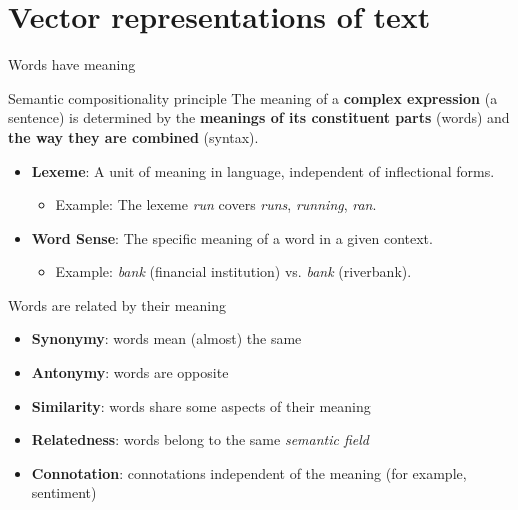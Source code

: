 \documentclass{beamer}
\begin{document}
\section{Vector representations of text}



\begin{frame}{Words have meaning}
  \begin{block}{Semantic compositionality principle}
    The meaning of a \textbf{complex expression} (a sentence) is determined by the \textbf{meanings of its constituent parts} (words) and \textbf{the way they are combined} (syntax).
  \end{block}
  
    \begin{itemize}
        \item \textbf{Lexeme}: A unit of meaning in language, independent of inflectional forms.
        \begin{itemize}
            \item Example: The lexeme \textit{run} covers \textit{runs}, \textit{running}, \textit{ran}.
        \end{itemize}
        \item \textbf{Word Sense}: The specific meaning of a word in a given context.
        \begin{itemize}
            \item Example: \textit{bank} (financial institution) vs. \textit{bank} (riverbank).
        \end{itemize}
    \end{itemize}
\end{frame}

\begin{frame}{Words are related by their meaning}
  \begin{itemize}
      \item \textbf{Synonymy}: words mean (almost) the same 
      \item \textbf{Antonymy}: words are opposite
      \item \textbf{Similarity}: words share some aspects of their meaning
      \item \textbf{Relatedness}: words belong to the same \textit{semantic field}
      \item \textbf{Connotation}: connotations independent of the meaning (for example, sentiment)
  \end{itemize}
\end{frame}
\end{document}
